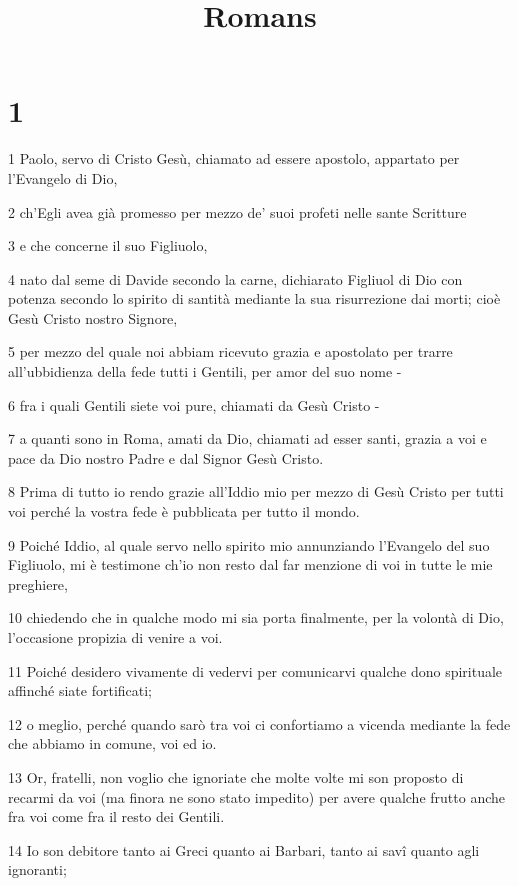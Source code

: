 

\title{Romans}


\chapter{1}

\par 1 Paolo, servo di Cristo Gesù, chiamato ad essere apostolo, appartato per l'Evangelo di Dio,
\par 2 ch'Egli avea già promesso per mezzo de' suoi profeti nelle sante Scritture
\par 3 e che concerne il suo Figliuolo,
\par 4 nato dal seme di Davide secondo la carne, dichiarato Figliuol di Dio con potenza secondo lo spirito di santità mediante la sua risurrezione dai morti; cioè Gesù Cristo nostro Signore,
\par 5 per mezzo del quale noi abbiam ricevuto grazia e apostolato per trarre all'ubbidienza della fede tutti i Gentili, per amor del suo nome -
\par 6 fra i quali Gentili siete voi pure, chiamati da Gesù Cristo -
\par 7 a quanti sono in Roma, amati da Dio, chiamati ad esser santi, grazia a voi e pace da Dio nostro Padre e dal Signor Gesù Cristo.
\par 8 Prima di tutto io rendo grazie all'Iddio mio per mezzo di Gesù Cristo per tutti voi perché la vostra fede è pubblicata per tutto il mondo.
\par 9 Poiché Iddio, al quale servo nello spirito mio annunziando l'Evangelo del suo Figliuolo, mi è testimone ch'io non resto dal far menzione di voi in tutte le mie preghiere,
\par 10 chiedendo che in qualche modo mi sia porta finalmente, per la volontà di Dio, l'occasione propizia di venire a voi.
\par 11 Poiché desidero vivamente di vedervi per comunicarvi qualche dono spirituale affinché siate fortificati;
\par 12 o meglio, perché quando sarò tra voi ci confortiamo a vicenda mediante la fede che abbiamo in comune, voi ed io.
\par 13 Or, fratelli, non voglio che ignoriate che molte volte mi son proposto di recarmi da voi (ma finora ne sono stato impedito) per avere qualche frutto anche fra voi come fra il resto dei Gentili.
\par 14 Io son debitore tanto ai Greci quanto ai Barbari, tanto ai savî quanto agli ignoranti;
